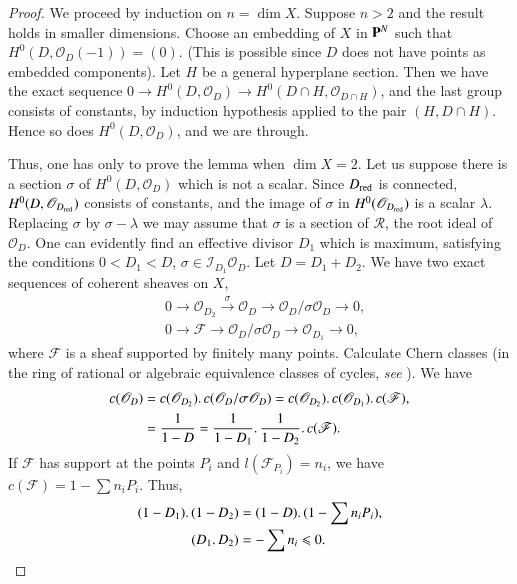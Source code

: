\begin{proof}
We proceed by induction on $n = \dim X$. Suppose $n >2$ and the result holds in smaller dimensions. Choose an embedding of $X$ in $\mathbf{P}^N$ such that $H^0(D, \mathscr{O}_D (-1))=(0)$. (This is possible since $D$ does not have points as embedded components). Let $H$ be a general hyperplane section. Then we have the exact sequence $0 \to H^0 (D, \mathscr{O}_D) \to H^0 (D \cap H, \mathscr{O}_{D\cap H})$, and the last group consists of constants, by induction hypothesis applied to the pair $(H, D \cap H)$. Hence so does $H^0 (D, \mathscr{O}_D)$, and we are through.

Thus, one has only to prove the lemma when $\dim X =2$. Let us suppose there is a section $\sigma$ of $H^0 (D, \mathscr{O}_D)$ which is not a scalar. Since $D_{\operatorname{red}}$ is connected, $H^0 (D, \mathscr{O}_{D_{\operatorname{red}}})$ consists of constants, and the image of $\sigma$ in $H^0(\mathscr{O}_{D_{\operatorname{red}}})$ is a scalar $\lambda$. Replacing $\sigma$ by $\sigma -\lambda$ we may assume that $\sigma$ is a section of $\mathscr{R}$, the root ideal of $\mathscr{O}_D$. One can evidently find an effective divisor $D_1$ which is maximum, satisfying the conditions $0 < D_1 < D$, $\sigma \in \mathscr{I}_{D_1} \mathscr{O}_D$. Let $D = D_1+ D_2$. We have two exact sequences of coherent sheaves on $X$,
\begin{align*}
& 0 \longrightarrow \mathscr{O}_{D_2} \xrightarrow{~\sigma~} \mathscr{O}_D \longrightarrow \mathscr{O}_{D} /\sigma \mathscr{O}_D \longrightarrow 0,\\
& 0 \longrightarrow \mathscr{F} \longrightarrow \mathscr{O}_D / \sigma \mathscr{O}_D \longrightarrow \mathscr{O}_{D_1} \longrightarrow 0,
\end{align*}
where $\mathscr{F}$ is a sheaf supported by finitely many
points. Calculate Chern classes (in the ring of rational or algebraic
equivalence classes of cycles, {\em see} \cite{art9-key5}). We have  
\begin{align*}
c (\mathscr{O}_D) & = c (\mathscr{O}_{D_2}) \ldotp c(\mathscr{O}_D / \sigma \mathscr{O}_D) = c (\mathscr{O}_{D_2}) \ldotp c (\mathscr{O}_{D_1}) \ldotp c (\mathscr{F}),\\
& = \frac{1}{1-D} = \frac{1}{1-D_1} \ldotp \frac{1}{1-D_2}  \ldotp c(\mathscr{F}).
\end{align*}\pageoriginale
If $\mathscr{F}$ has support at the points $P_i$ and $l(\mathscr{F}_{P_i}) = n_i$, we have  $c(\mathscr{F}) = 1 - \sum n_i P_i$. Thus,
\begin{align*}
(1-D_1) \ldotp (1 - D_2) & = (1-D) \ldotp (1 - \sum n_i P_i),\\
(D_1 \ldotp D_2) & = - \sum n_i \leqslant 0.
\end{align*}
\end{proof}

